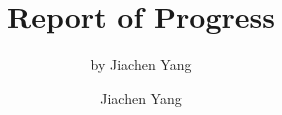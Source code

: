  
\usepackage[round]{natbib}
\usepackage{tikz} 
\usepackage{mathptmx}
\usepackage[T1]{fontenc}
\usepackage[latin1]{inputenc}
\usepackage{color}
\usepackage{amsmath}
\usepackage{amssymb}


\usepackage{listings}

\def\beamer@linkspace#1{%
  \begin{pgfpicture}{0pt}{-1.5pt}{#1}{5.5pt}
    \pgfsetfillopacity{0}
    \pgftext[x=0pt,y=-1.5pt]{.}
    \pgftext[x=#1,y=5.5pt]{.}
  \end{pgfpicture}}


\usepackage[english]{babel}


\graphicspath{{figure/}}



\newcommand{\br}[0]{\par\vskip15pt\par}




\title[report]{Report of Progress}


\subtitle{by Jiachen Yang}

\author[jc-yang]{
	Jiachen Yang 
}




\frame{\maketitle}




